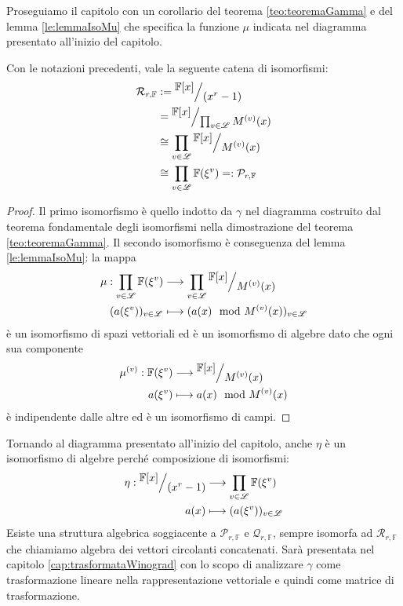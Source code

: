 Proseguiamo il capitolo con un corollario del teorema \ref{teo:teoremaGamma} e del lemma \ref{le:lemmaIsoMu} che specifica la funzione $\mu$ indicata nel diagramma presentato all'inizio del capitolo.
\begin{corollario}
  Con le notazioni precedenti, vale la seguente catena di isomorfismi:
  \begin{align*}
      \mathcal{R}_{r, \mathbb{F}} & := \quotient{\mathbb{F} \lbrack x \rbrack  }{ (x^{r} - 1)} \\
            & = \quotient{\mathbb{F} \lbrack x \rbrack  }{ \prod_{v\in \mathscr{L}} M^{(v)}(x)} \\
            &\cong \prod_{v\in \mathscr{L}} \quotient{\mathbb{F} \lbrack x \rbrack  }{M^{(v)}(x)}  \\ 
            &\cong \prod_{v\in \mathscr{L}} \mathbb{F}(\xi^{v}) =: \mathcal{P}_{r,\mathbb{F}}
   \end{align*}
\end{corollario}
\begin{proof}
   Il primo isomorfismo è quello indotto da $\gamma$ nel diagramma costruito dal teorema fondamentale degli isomorfismi nella dimostrazione del teorema \ref{teo:teoremaGamma}. Il secondo isomorfismo è conseguenza del lemma \ref{le:lemmaIsoMu}: la mappa 
   \begin{align*}
   \mu : \prod_{v\in \mathscr{L}} \mathbb{F}(\xi^{v})   
	    & \longrightarrow  
	    \prod_{v\in \mathscr{L}} \quotient{\mathbb{F} \lbrack x \rbrack  }{M^{(v)}(x)}   \\
	    (a(\xi^{v}))_{v \in \mathscr{L}} &\longmapsto  ( a(x)\mod{M^{(v)}(x)})_{v \in \mathscr{L}}
   \end{align*}
   è un isomorfismo di spazi vettoriali ed è un isomorfismo di algebre dato che ogni sua componente 
   \begin{align*}
   \mu^{(v)} :  \mathbb{F}(\xi^{v})   
	    & \longrightarrow  
	    \quotient{\mathbb{F} \lbrack x \rbrack  }{M^{(v)}(x)}   \\
	    a(\xi^{v}) &\longmapsto  a(x)\mod{M^{(v)}(x)}
   \end{align*}   
   è indipendente dalle altre ed è un isomorfismo di campi.
\end{proof}

Tornando al diagramma presentato all'inizio del capitolo, anche $\eta$ è un isomorfismo di algebre perché composizione di isomorfismi:
\begin{align*}
\eta : \quotient{\mathbb{F} \lbrack x \rbrack  }{(x^r - 1)}   
	& \longrightarrow  
	 \prod_{v\in \mathscr{L}} \mathbb{F}(\xi^{v})   \\
	a(x) &\longmapsto  (a(\xi^{v}))_{v\in \mathscr{L}}
\end{align*}
Esiste una struttura algebrica soggiacente a $\mathcal{P}_{r,\mathbb{F}}$ e $\mathcal{Q}_{r,\mathbb{F}}$, sempre isomorfa ad $\mathcal{R}_{r,\mathbb{F}}$ che chiamiamo algebra dei vettori circolanti concatenati. Sarà presentata nel capitolo \ref{cap:trasformataWinograd} con lo scopo di analizzare $\gamma$ come trasformazione lineare nella rappresentazione vettoriale e quindi come matrice di trasformazione.


